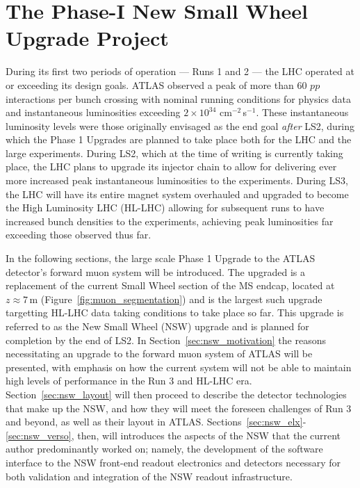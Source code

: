 \chapter{The Phase-I New Small Wheel Upgrade Project}
\label{chap:nsw}

During its first two periods of operation --- Runs 1 and 2 --- the LHC operated
at or exceeding its design goals.
ATLAS observed a peak of more than 60 $pp$ interactions per bunch crossing with nominal running conditions for physics data
and instantaneous luminosities exceeding $2\times 10^{34}$ cm$^{-2}$\,s$^{-1}$.
These instantaneous luminosity levels were those originally envisaged as the end goal \textit{after} LS2,
during which the Phase 1 Upgrades are planned to take place both for the LHC and the large experiments.
During LS2, which at the time of writing is currently taking place, the LHC plans to upgrade its injector chain to allow for delivering ever
more increased peak instantaneous luminosities to the experiments.
During LS3, the LHC will have its entire magnet system overhauled and upgraded to become the
High Luminosity LHC (HL-LHC) allowing for subsequent runs to have increased bunch densities 
to the experiments, achieving peak luminosities far exceeding those observed thus far.

In the following sections, the large scale Phase 1 Upgrade to the ATLAS detector's forward muon system
will be introduced.
The upgraded is a replacement of the current Small Wheel section of the MS endcap, located at $z \approx 7$\,m (Figure~\ref{fig:muon_segmentation})
and is the largest such upgrade targetting HL-LHC data taking conditions to take place so far.
This upgrade is referred to as the New Small Wheel (NSW) upgrade and is planned for completion by
the end of LS2.
In Section~\ref{sec:nsw_motivation} the reasons necessitating an upgrade to the forward muon system
of ATLAS will be presented, with emphasis on how the current system will not be able to maintain high
levels of performance in the Run 3 and HL-LHC era.
Section~\ref{sec:nsw_layout} will then proceed to describe the detector technologies that make up
the NSW, and how they will meet the foreseen challenges of Run 3 and beyond, as well as their layout
in ATLAS.
Sections~\ref{sec:nsw_elx}-\ref{sec:nsw_verso}, then, will introduces the aspects of the NSW that the
current author predominantly worked on; namely, the development of the software interface to the NSW front-end readout
electronics and detectors necessary for both validation and integration of the NSW readout infrastructure.


